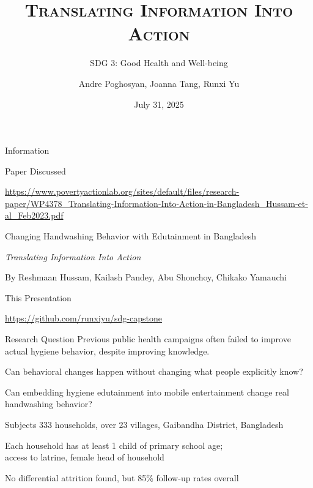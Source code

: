 \documentclass[aspectratio=169]{beamer}
\title{\scshape Translating Information Into Action}
\subtitle{\upshape SDG 3: Good Health and Well-being}
\author{Andre Poghosyan, Joanna Tang, Runxi Yu}
\date{July 31, 2025}
\begin{document}
\maketitle

\begin{frame}{Information}
	\begin{block}{Paper Discussed}
		\setlength{\parskip}{0.8ex}

		\url{https://www.povertyactionlab.org/sites/default/files/research-paper/WP4378_Translating-Information-Into-Action-in-Bangladesh_Hussam-et-al_Feb2023.pdf}

		Changing Handwashing Behavior with Edutainment in Bangladesh

		\textit{Translating Information Into Action}

		By Reshmaan Hussam, Kailash Pandey, Abu Shonchoy, Chikako Yamauchi
	\end{block}
	\begin{block}{This Presentation}
		\setlength{\parskip}{0.8ex}

		\url{https://github.com/runxiyu/sdg-capstone}
	\end{block}
\end{frame}

\begin{frame}{Research Question}
	Previous public health campaigns often failed to improve actual hygiene behavior, despite improving knowledge.

	Can behavioral changes happen without changing what people explicitly know?

	\Large Can embedding hygiene edutainment into mobile entertainment change real handwashing behavior?

\end{frame}

\begin{frame}{Subjects}
	333 households, over 23 villages, Gaibandha District, Bangladesh

	Each household has at least 1 child of primary school age;\\
	access to latrine, female head of household

	\bigskip

	No differential attrition found, but 85\% follow-up rates overall
\end{frame}
\end{document}
